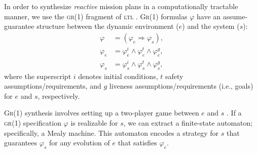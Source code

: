 In order to synthesize \emph{reactive} mission plans in a computationally tractable manner, we use the \textsc{gr(1)} fragment of \textsc{ltl} \cite{piterman_06}.
\textsc{Gr(1)} formulas $\varphi$ have an assume-guarantee structure between the dynamic environment ($e$) and the system ($s$):
\begin{equation}\label{GR1Formula}
\begin{split}
	\varphi &= (\varphi_e \Rightarrow \varphi_s),\\
	\varphi_e &= \varphi_e^i \wedge \varphi_e^t \wedge \varphi_e^g,\\
	\varphi_s &= \varphi_s^i \wedge \varphi_s^t \wedge \varphi_s^g,
\end{split}
\end{equation}
where the superscript $i$ denotes initial conditions, $t$ safety assumptions/requirements, and $g$ liveness assumptions/requirements (i.e., goals) for $e$ and $s$, respectively. 

\textsc{Gr(1)} synthesis involves setting up a two-player game between $e$ and $s$ \cite{piterman_06}.
If a \textsc{gr(1)} specification $\varphi$ is realizable for $s$, we can extract a finite-state automaton; specifically, a Mealy machine. 
This automaton encodes a strategy for $s$ that guarantees $\varphi_s$ for any evolution of $e$ that satisfies $\varphi_e$.

